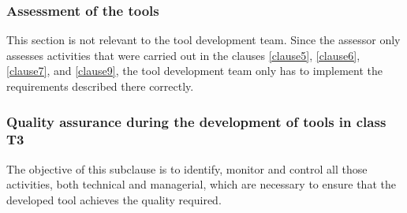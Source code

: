 \documentclass{template/openetcs_report}
\begin{document}
\subsubsection{Assessment of the tools}
This section is not relevant to the tool development team. Since the assessor only assesses activities that were carried out in the clauses \ref{clause5}, \ref{clause6}, \ref{clause7}, and \ref{clause9}, the tool development team only has to implement the requirements described there correctly.


\subsubsection{Quality assurance during the development of tools in class T3}
\begin{flushleft}
The objective of this subclause is to identify, monitor and control all those activities, both technical and managerial, which are necessary to ensure that the developed tool achieves the quality required. 
\end{flushleft}
\end{document}
